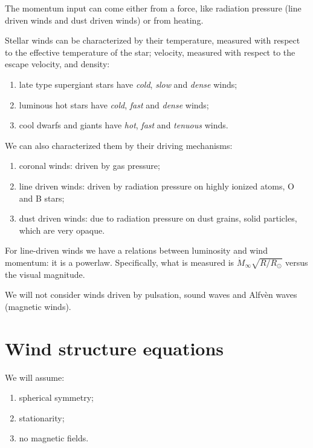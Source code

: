 \documentclass[main.tex]{subfiles}
\begin{document}

The momentum input can come either from a force, like radiation pressure (line driven winds and dust driven winds) or from heating.

Stellar winds can be characterized by their temperature, measured with respect to the effective temperature of the star; velocity, measured with respect to the escape velocity, and density: 
\begin{enumerate}
  \item late type supergiant stars have \emph{cold},  \emph{slow} and \emph{dense} winds;
  \item luminous hot stars have \emph{cold}, \emph{fast} and \emph{dense} winds;
  \item cool dwarfs and giants have \emph{hot}, \emph{fast} and \emph{tenuous} winds.
\end{enumerate}

We can also characterized them by their driving mechanisms:
\begin{enumerate}
    \item coronal winds: driven by gas pressure;
    \item line driven winds: driven by radiation pressure on highly ionized atoms, O and B stars;
    \item dust driven winds: due to radiation pressure on dust grains, solid particles, which are very opaque.
\end{enumerate}

For line-driven winds we have a relations between luminosity and wind momentum: it is a powerlaw. 
Specifically, what is measured is \(\dot{M}_{ \infty } \sqrt{R / R_{\odot}}\) versus the visual magnitude. 

We will not consider winds driven by pulsation, sound waves and Alfvèn waves (magnetic winds).

\section{Wind structure equations}

We will assume:
\begin{enumerate}
    \item spherical symmetry;
    \item stationarity;
    \item no magnetic fields.
\end{enumerate}
\end{document}
